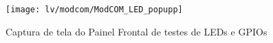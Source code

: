         \begin{figure}
                \centering
                 \texttt{[image: lv/modcom/ModCOM\_LED\_popupp]}
                \caption{Captura de tela do Painel Frontal de testes de LEDs e GPIOs}
                \label{fig:modcomledp}
        \end{figure}
    \begin{comment}
        
         \begin{figure}
                \centering
                \texttt{[image: lv/modcom/ModCOM\_lvclass\_desligamentoresetd]}
                \caption{Captura de tela do Rotina de desligamento e reset do modem}
                \label{fig:modcomshutdown}
        \end{figure}
        
        
        \begin{figure}
                \centering
                 \texttt{[image: lv/modcom/ModCOM\_LED\_I2Cd]}
                \caption{Captura de tela do comunicador i2c}
                \label{fig:modcomledi2c}
        \end{figure}
        
        
        \begin{figure}
                \centering
                 \texttt{[image: lv/modcom/ModCOM\_morted]}
                \caption{Captura de tela do Teste de fechamento ou morte de comunicação serial}
                \label{fig:modcommorte}
        \end{figure}
        
        \begin{figure}
                \centering
                 \texttt{[image: lv/modcom/ModCOM\_nopsutestd]}
                \caption{Captura de tela do Captura de tela da rotina de teste sem fonte de alimentação}
                \label{fig:modcomnopsu}
        \end{figure}
        
        \begin{figure}
                \centering
                 \texttt{[image: lv/modcom/ModCOM\_simcard]}
                \caption{Captura de tela da rotina de teste dos simcard}
                \label{fig:modcomsimcard}
        \end{figure}
        
        \begin{figure}
                \centering
                 \texttt{[image: lv/modcom/ModCOM\_temp]}
                \caption{Captura de tela da rotina de teste do sensor de temperatura}
                \label{fig:modcomtemp}
        \end{figure}
        

\end{comment}
